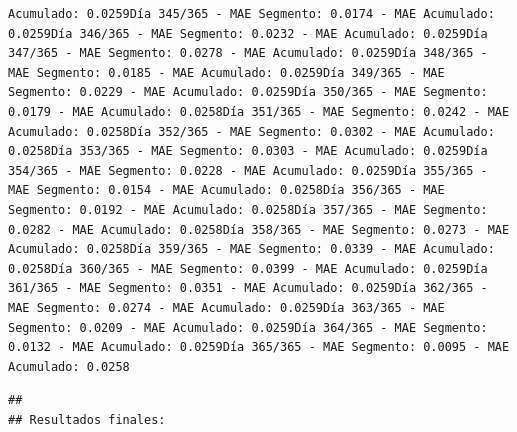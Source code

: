 \documentclass[
]{book}
\begin{document}
\begin{verbatim}
Acumulado: 0.0259Día 345/365 - MAE Segmento: 0.0174 - MAE Acumulado: 0.0259Día 346/365 - MAE Segmento: 0.0232 - MAE Acumulado: 0.0259Día 347/365 - MAE Segmento: 0.0278 - MAE Acumulado: 0.0259Día 348/365 - MAE Segmento: 0.0185 - MAE Acumulado: 0.0259Día 349/365 - MAE Segmento: 0.0229 - MAE Acumulado: 0.0259Día 350/365 - MAE Segmento: 0.0179 - MAE Acumulado: 0.0258Día 351/365 - MAE Segmento: 0.0242 - MAE Acumulado: 0.0258Día 352/365 - MAE Segmento: 0.0302 - MAE Acumulado: 0.0258Día 353/365 - MAE Segmento: 0.0303 - MAE Acumulado: 0.0259Día 354/365 - MAE Segmento: 0.0228 - MAE Acumulado: 0.0259Día 355/365 - MAE Segmento: 0.0154 - MAE Acumulado: 0.0258Día 356/365 - MAE Segmento: 0.0192 - MAE Acumulado: 0.0258Día 357/365 - MAE Segmento: 0.0282 - MAE Acumulado: 0.0258Día 358/365 - MAE Segmento: 0.0273 - MAE Acumulado: 0.0258Día 359/365 - MAE Segmento: 0.0339 - MAE Acumulado: 0.0258Día 360/365 - MAE Segmento: 0.0399 - MAE Acumulado: 0.0259Día 361/365 - MAE Segmento: 0.0351 - MAE Acumulado: 0.0259Día 362/365 - MAE Segmento: 0.0274 - MAE Acumulado: 0.0259Día 363/365 - MAE Segmento: 0.0209 - MAE Acumulado: 0.0259Día 364/365 - MAE Segmento: 0.0132 - MAE Acumulado: 0.0259Día 365/365 - MAE Segmento: 0.0095 - MAE Acumulado: 0.0258
\end{verbatim}

\begin{verbatim}
## 
## Resultados finales:
\end{verbatim}
\end{document}
